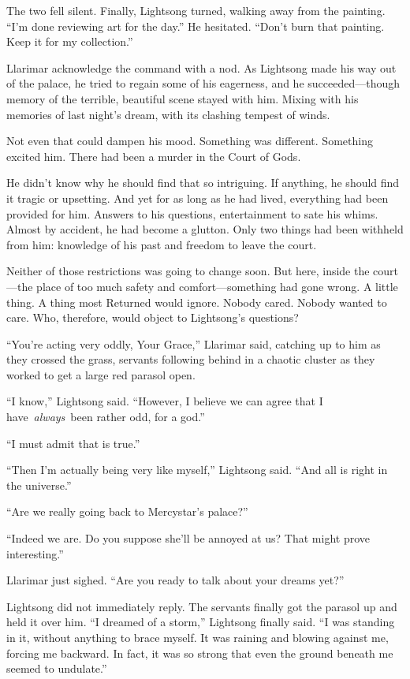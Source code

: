 The two fell silent. Finally, Lightsong turned, walking away from the painting. “I’m done reviewing art for the day.” He hesitated. “Don’t burn that painting. Keep it for my collection.”

Llarimar acknowledge the command with a nod. As Lightsong made his way out of the palace, he tried to regain some of his eagerness, and he succeeded—though memory of the terrible, beautiful scene stayed with him. Mixing with his memories of last night’s dream, with its clashing tempest of winds.

Not even that could dampen his mood. Something was different. Something excited him. There had been a murder in the Court of Gods.

He didn’t know why he should find that so intriguing. If anything, he should find it tragic or upsetting. And yet for as long as he had lived, everything had been provided for him. Answers to his questions, entertainment to sate his whims. Almost by accident, he had become a glutton. Only two things had been withheld from him: knowledge of his past and freedom to leave the court.

Neither of those restrictions was going to change soon. But here, inside the court—the place of too much safety and comfort—something had gone wrong. A little thing. A thing most Returned would ignore. Nobody cared. Nobody wanted to care. Who, therefore, would object to Lightsong’s questions?

“You’re acting very oddly, Your Grace,” Llarimar said, catching up to him as they crossed the grass, servants following behind in a chaotic cluster as they worked to get a large red parasol open.

“I know,” Lightsong said. “However, I believe we can agree that I have~\textit{always}~been rather odd, for a god.”

“I must admit that is true.”

“Then I’m actually being very like myself,” Lightsong said. “And all is right in the universe.”

“Are we really going back to Mercystar’s palace?”

“Indeed we are. Do you suppose she’ll be annoyed at us? That might prove interesting.”

Llarimar just sighed. “Are you ready to talk about your dreams yet?”

Lightsong did not immediately reply. The servants finally got the parasol up and held it over him. “I dreamed of a storm,” Lightsong finally said. “I was standing in it, without anything to brace myself. It was raining and blowing against me, forcing me backward. In fact, it was so strong that even the ground beneath me seemed to undulate.”

